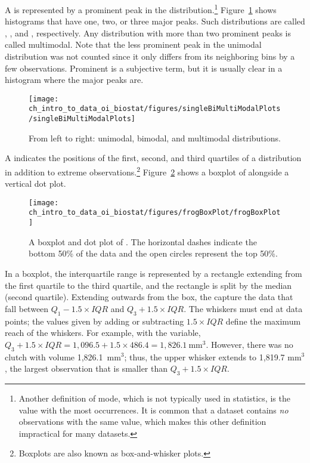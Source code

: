 \textD{\newpage}

A  is represented by a prominent peak in the distribution.\footnote{Another definition of mode, which is not typically used in statistics, is the value with the most occurrences. It is common that a dataset contains \emph{no} observations with the same value, which makes this other definition impractical for many datasets.} Figure~\ref{singleBiMultiModalPlots} shows histograms that have one, two, or three major peaks. Such distributions are called , , and , respectively. Any distribution with more than two prominent peaks is called multimodal. Note that the less prominent peak in the unimodal distribution was not counted since it only differs from its neighboring bins by a few observations. Prominent is a subjective term, but it is usually clear in a histogram where the major peaks are.  

\begin{figure}[h]
	\centering
	\texttt{[image: ch\_intro\_to\_data\_oi\_biostat/figures/singleBiMultiModalPlots/singleBiMultiModalPlots]}
	\caption{From left to right: unimodal, bimodal, and multimodal distributions.}
	\label{singleBiMultiModalPlots}
\end{figure}

A  indicates the positions of the first, second, and third quartiles of a distribution in addition to extreme observations.\footnote{Boxplots are also known as box-and-whisker plots.} Figure~\ref{frogBoxPlot} shows a boxplot of  alongside a vertical dot plot.

\begin{figure}[th]
	\centering
	\texttt{[image: ch\_intro\_to\_data\_oi\_biostat/figures/frogBoxPlot/frogBoxPlot]}
	\caption{A boxplot and dot plot of . The horizontal dashes indicate the bottom 50\% of the data and the open circles represent the top 50\%.}
	\label{frogBoxPlot}
\end{figure}

\textD{\newpage}

In a boxplot, the interquartile range is represented by a rectangle extending from the first quartile to the third quartile, and the rectangle is split by the median (second quartile). Extending outwards from the box, the  capture the data that fall between $Q_1 - 1.5\times IQR$ and $Q_3 + 1.5\times IQR$. The whiskers must end at data points; the values given by adding or subtracting $1.5\times IQR$ define the maximum reach of the whiskers. For example, with the  variable, $Q_3 + 1.5 \times IQR = 1,096.5 + 1.5\times 486.4 = 1,826.1\ \textrm {mm}^{3}$. However, there was no clutch with volume 1,826.1\ $\textrm {mm}^{3}$; thus, the upper whisker extends to 1,819.7 $\textrm {mm}^{3}$, the largest observation that is smaller than $Q_3 + 1.5\times IQR$.

